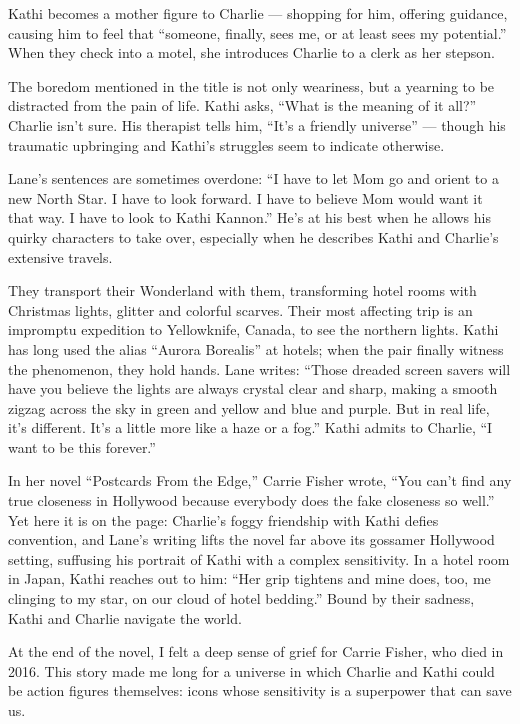 Kathi becomes a mother figure to Charlie --- shopping for him, offering
guidance, causing him to feel that ``someone, finally, sees me, or at
least sees my potential.'' When they check into a motel, she introduces
Charlie to a clerk as her stepson.

The boredom mentioned in the title is not only weariness, but a yearning
to be distracted from the pain of life. Kathi asks, ``What is the
meaning of it all?'' Charlie isn't sure. His therapist tells him, ``It's
a friendly universe'' --- though his traumatic upbringing and Kathi's
struggles seem to indicate otherwise.

Lane's sentences are sometimes overdone: ``I have to let Mom go and
orient to a new North Star. I have to look forward. I have to believe
Mom would want it that way. I have to look to Kathi Kannon.'' He's at
his best when he allows his quirky characters to take over, especially
when he describes Kathi and Charlie's extensive travels.

They transport their Wonderland with them, transforming hotel rooms with
Christmas lights, glitter and colorful scarves. Their most affecting
trip is an impromptu expedition to Yellowknife, Canada, to see the
northern lights. Kathi has long used the alias ``Aurora Borealis'' at
hotels; when the pair finally witness the phenomenon, they hold hands.
Lane writes: ``Those dreaded screen savers will have you believe the
lights are always crystal clear and sharp, making a smooth zigzag across
the sky in green and yellow and blue and purple. But in real life, it's
different. It's a little more like a haze or a fog.'' Kathi admits to
Charlie, ``I want to be this forever.''

In her novel ``Postcards From the Edge,'' Carrie Fisher wrote, ``You
can't find any true closeness in Hollywood because everybody does the
fake closeness so well.'' Yet here it is on the page: Charlie's foggy
friendship with Kathi defies convention, and Lane's writing lifts the
novel far above its gossamer Hollywood setting, suffusing his portrait
of Kathi with a complex sensitivity. In a hotel room in Japan, Kathi
reaches out to him: ``Her grip tightens and mine does, too, me clinging
to my star, on our cloud of hotel bedding.'' Bound by their sadness,
Kathi and Charlie navigate the world.

At the end of the novel, I felt a deep sense of grief for Carrie Fisher,
who died in 2016. This story made me long for a universe in which
Charlie and Kathi could be action figures themselves: icons whose
sensitivity is a superpower that can save us.

